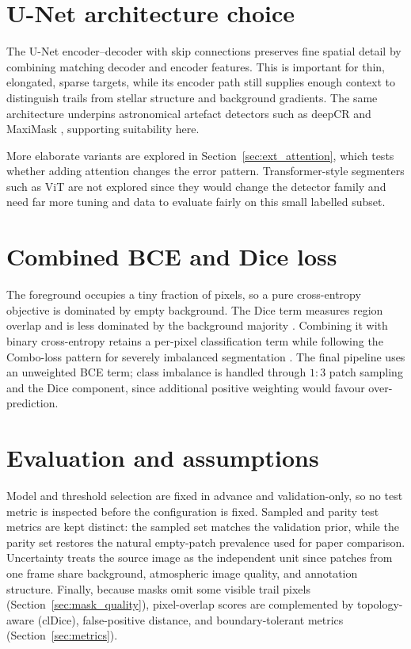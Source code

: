 \documentclass{cam-thesis}
\begin{document}
\section{U-Net architecture choice}
\label{sec:why_unet}

The U-Net encoder--decoder with skip connections \citep{ronneberger2015}
preserves fine spatial detail by combining matching decoder and
encoder features. This is important for thin, elongated, sparse targets, while
its encoder path still supplies enough context to distinguish trails from
stellar structure and background gradients. The same architecture underpins
astronomical artefact detectors such as deepCR \citep{zhang2020} and MaxiMask
\citep{paillassa2020}, supporting suitability here.

More elaborate variants are explored in Section~\ref{sec:ext_attention}, which
tests whether adding attention changes the error pattern. Transformer-style
segmenters such as ViT are not explored since they
would change the detector family and need far more tuning and data to
evaluate fairly on this small labelled subset.

\section{Combined BCE and Dice loss}
\label{sec:why_loss}

The foreground occupies a tiny fraction of pixels, so a pure cross-entropy
objective is dominated by empty background. The Dice term measures region overlap
and is less dominated by the background majority \citep{milletari2016}.
Combining it with binary cross-entropy retains a per-pixel classification term
while following the Combo-loss pattern for severely imbalanced segmentation
\citep{taghanaki2019}. The final pipeline uses an unweighted BCE term; class
imbalance is handled through $1{:}3$ patch sampling and the Dice component,
since additional positive weighting would favour over-prediction.

\section{Evaluation and assumptions}
\label{sec:eval_philosophy}

Model and threshold selection are fixed in advance and validation-only,
so no test metric is inspected before the configuration is fixed.
Sampled and parity test metrics are kept distinct: the
sampled set matches the validation prior, while the parity set restores the
natural empty-patch prevalence used for paper comparison. Uncertainty
treats the source image as the independent unit since patches
from one frame share background, atmospheric image quality, and annotation
structure. Finally, because masks omit some visible trail pixels (Section~\ref{sec:mask_quality}),
pixel-overlap scores are complemented by topology-aware (clDice),
false-positive distance, and boundary-tolerant metrics (Section~\ref{sec:metrics}).
\end{document}
